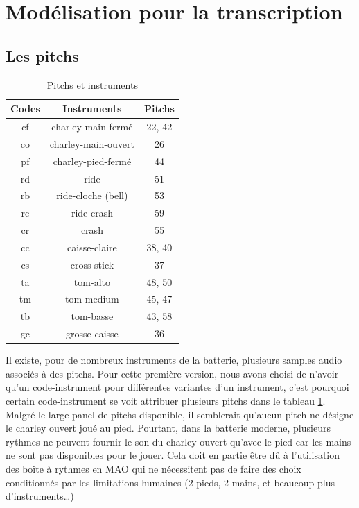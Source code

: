 \section{Modélisation pour la transcription}
\label{modelisation_transcription}
\subsection*{Les pitchs}
\begin{table}[h]
	\centering
	\begin{tabular}{|c|c|c|} \hline
		Codes & Instruments & Pitchs \\ \hline
		cf & charley-main-fermé & 22, 42 \\
		co & charley-main-ouvert & 26 \\
		pf & charley-pied-fermé & 44 \\
		rd & ride & 51 \\
		rb & ride-cloche (bell) & 53 \\
		rc & ride-crash & 59 \\
		cr & crash & 55 \\
		cc & caisse-claire & 38, 40 \\
		cs & cross-stick & 37 \\
		ta & tom-alto & 48, 50 \\
		tm & tom-medium & 45, 47 \\
		tb & tom-basse & 43, 58 \\
		gc & grosse-caisse & 36 \\ \hline
	\end{tabular}
	\caption{Pitchs et instruments}
	\label{pitchs_instru}
\end{table}
Il existe, pour de nombreux instruments de la batterie, plusieurs samples audio associés à des pitchs. Pour cette première version, nous avons choisi de n’avoir qu’un code-instrument pour différentes variantes d’un instrument, c’est pourquoi certain code-instrument se voit attribuer plusieurs pitchs dans le tableau \ref{pitchs_instru}.\\
Malgré le large panel de pitchs disponible, il semblerait qu’aucun pitch ne désigne le charley ouvert joué au pied. Pourtant, dans la batterie moderne, plusieurs rythmes ne peuvent fournir le son du charley ouvert qu’avec le pied car les mains ne sont pas disponibles pour le jouer. Cela doit en partie être dû à l’utilisation des boîte à rythmes en MAO qui ne nécessitent pas de faire des choix conditionnés par les limitations humaines (2 pieds, 2 mains, et beaucoup plus d’instruments…)
